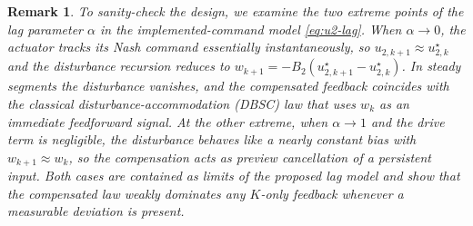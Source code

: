 \documentclass[letterpaper, 10 pt, conference]{ieeeconf}  %
\newtheorem{remark}{\textbf{Remark}}
\begin{document}

\begin{remark}
To sanity-check the design, we examine the two extreme points of the lag parameter 
$\alpha$ in the implemented-command model \eqref{eq:u2-lag}. 
When $\alpha\to 0$, the actuator tracks its Nash command essentially instantaneously, so 
$u_{2,k+1}\approx u^{\star}_{2,k}$ and the disturbance recursion reduces to 
$w_{k+1}=-B_2(u^{\star}_{2,k+1}-u^{\star}_{2,k})$. In steady segments the disturbance vanishes, 
and the compensated feedback coincides with the classical disturbance-accommodation (DBSC) law 
that uses $w_k$ as an immediate feedforward signal. At the other extreme, when $\alpha\to 1$ and 
the drive term is negligible, the disturbance behaves like a nearly constant bias with 
$w_{k+1}\approx w_k$, so the compensation acts as preview cancellation of a persistent input. 
Both cases are contained as limits of the proposed lag model and show that the compensated law 
weakly dominates any $K$-only feedback whenever a measurable deviation is present.
\end{remark}

\end{document}
